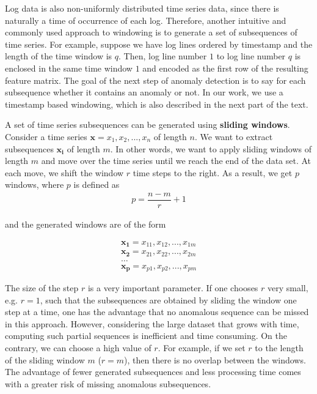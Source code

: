 Log data is also non-uniformly distributed time series data, since there is naturally a time of occurrence of each log. Therefore, another intuitive and commonly used approach to windowing is to generate a set of subsequences of time series. For example, suppose we have log lines ordered by timestamp and the length of the time window is $q$. Then, log line number $1$ to log line number $q$ is enclosed in the same time window $1$ and encoded as the first row of the resulting feature matrix. The goal of the next step of anomaly detection is to say for each subsequence whether it contains an anomaly or not. In our work, we use a timestamp based windowing, which is also described in the next part of the text.

A set of time series subsequences can be generated using \textbf{sliding windows}. Consider a time series $\mathbf{x} = x_1, x_2, ..., x_n$ of length $n$. We want to extract subsequences $\mathbf{x_i}$ of length $m$. In other words, we want to apply sliding windows of length $m$ and move over the time series until we reach the end of the data set. At each move, we shift the window $r$ time steps to the right. As a result, we get $p$ windows, where $p$ is defined as
    \begin{gather*}
        p = \dfrac{n - m}{r} + 1
    \end{gather*}

and the generated windows are of the form 

\begin{gather*}
    \mathbf{x_1} = x_{11}, x_{12},..., x_{1m} \\
    \mathbf{x_2} = x_{21}, x_{22},..., x_{2m} \\
    \ldots\\
    \mathbf{x_p} = x_{p1}, x_{p2},..., x_{pm} 
\end{gather*}

The size of the step $r$ is a very important parameter. If one chooses $r$ very small, e.g. $r = 1$, such that the subsequences are obtained by sliding the window one step at a time, one has the advantage that no anomalous sequence can be missed in this approach. However, considering the large dataset that grows with time, computing such partial sequences is inefficient and time consuming. On the contrary, we can choose a high value of $r$. For example, if we set $r$ to the length of the sliding window $m$ ($r = m$), then there is no overlap between the windows. The advantage of fewer generated subsequences and less processing time comes with a greater risk of missing anomalous subsequences. 

